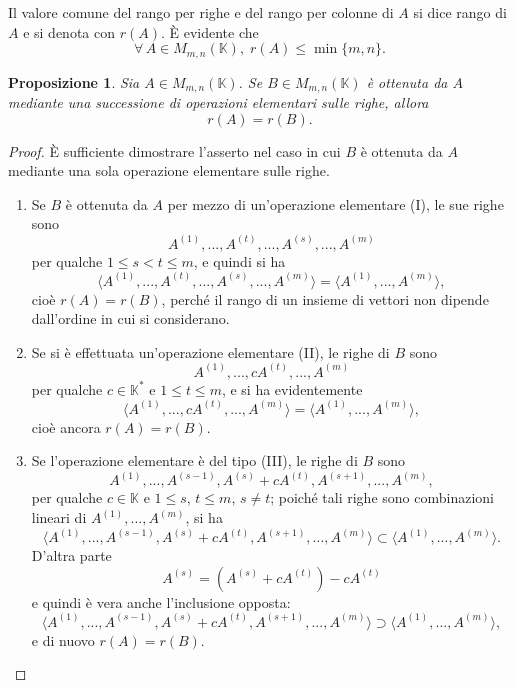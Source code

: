 \documentclass{article}
\theoremstyle{plain}
\newtheorem{prop}[thm]{Proposizione}
\theoremstyle{definition}
\theoremstyle{remark}
\begin{document}
\vspace{10pt}

Il valore comune del rango per righe e del rango per colonne di $A$ si dice rango di $A$ e si denota con $r(A)$. 
È evidente che \[\forall\, A\in M_{m,n}(\mathbb{K}),\;r(A) \leq \min\{m, n\}.\]

\vspace{10pt}

\begin{bxthm}
\begin{prop}
    Sia $A\in M_{m,n}(\mathbb{K})$. 
    Se $B\in M_{m,n}(\mathbb{K})$ è ottenuta da $A$ mediante una successione di operazioni elementari sulle righe, allora \[r(A) = r(B).\]
\end{prop}
\end{bxthm}
\begin{proof}
    È sufficiente dimostrare l'asserto nel caso in cui $B$ è ottenuta da $A$ mediante una sola operazione elementare sulle righe.
    \begin{enumerate}
        \item Se $B$ è ottenuta da $A$ per mezzo di un'operazione elementare (I), le sue righe sono 
        \[A^{(1)},...,A^{(t)},...,A^{(s)},...,A^{(m)}\]
        per qualche $1\leq s<t\leq m$, e quindi si ha
        \[\langle A^{(1)},...,A^{(t)},...,A^{(s)},...,A^{(m)}\rangle = \langle A^{(1)},...,A^{(m)}\rangle,\]
        cioè $r(A) = r(B)$, perché il rango di un insieme di vettori non dipende dall'ordine in cui si considerano.

        \item Se si è effettuata un'operazione elementare (II), le righe di $B$ sono 
        \[A^{(1)},...,cA^{(t)},...,A^{(m)}\] 
        per qualche $c\in \mathbb{K}^*$ e $1\leq t\leq m$, e si ha evidentemente
        \[\langle A^{(1)},...,cA^{(t)},...,A^{(m)}\rangle = \langle A^{(1)},...,A^{(m)}\rangle ,\]
        cioè ancora $r(A) = r(B)$.

        \item Se l'operazione elementare è del tipo (III), le righe di $B$ sono 
        \[A^{(1)},...,A^{(s-1)},A^{(s)}+cA^{(t)}, A^{(s+1)},...,A^{(m)},\] 
        per qualche $c\in \mathbb{K}$ e $1\leq s$, $t\leq m$, $s\neq t$; poiché tali righe sono combinazioni lineari di 
        $A^{(1)},...,A^{(m)}$, si ha
        \[\langle A^{(1)},...,A^{(s-1)},A^{(s)}+cA^{(t)},A^{(s+1)},...,A^{(m)}\rangle\subset\langle A^{(1)},...,A^{(m)}\rangle.\]
        D'altra parte
        \[A^{(s)}=\left(A^{(s)}+cA^{(t)}\right)-cA^{(t)}\]
        e quindi è vera anche l'inclusione opposta:
        \[\langle A^{(1)},...,A^{(s-1)},A^{(s)}+cA^{(t)},A^{(s+1)},...,A^{(m)}\rangle\supset\langle A^{(1)},...,A^{(m)}\rangle,\]
        e di nuovo $r(A)=r(B)$.
    \end{enumerate}
\end{proof}
\end{document}
